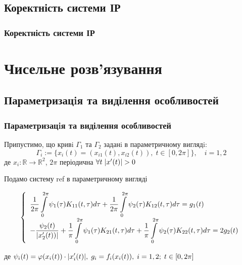 \documentclass{beamer}
\numberwithin{equation}{section}
\newcommand{\intl}{\int\limits}
\newcommand{\inttwopi}{\intl_{0}^{2\pi}}
\begin{document}
	\subsection{Коректність системи ІР}
	\begin{frame}
		\frametitle{Коректність системи ІР}
	\end{frame}
	
	\section{Чисельне розв'язування} 
	
	\subsection{Параметризацiя та виділення особливостей} 
	
	\begin{frame}
		\frametitle{Параметризацiя та виділення особливостей}
		Припустимо, що кривi $\Gamma_{1}$ та $\Gamma_{2}$ заданi в параметричному виглядi:
		\begin{equation}
			\Gamma_{i} := \{ x_{i}(t) = (x_{i1}(t), x_{i2}(t)), \; t \in [ 0, 2\pi ] \} , \quad i = 1, 2
		\end{equation}
		\indent де $x_{i} : \mathbb{R} \rightarrow \mathbb{R}^2$, $2\pi$ періодична $\forall{t} \; \abs{x'(t)} > 0$ 
		
		Подамо систему ref в параметричному вигляді
		\begin{small}
			\begin{equation}
				\label{IE-parametrized-system}
				\left\{
				\begin{array}{l}
					\displaystyle
					\frac{1}{2\pi} \inttwopi \psi_1(\tau) K_{11}(t, \tau) d \tau
					+ \frac{1}{2\pi} \inttwopi  \psi_2(\tau) K_{12}(t, \tau) d \tau
					= g_{1}(t)
					\\ [0.3cm]
					\displaystyle
					- \frac{\psi_2(t)}{\abs{x'_{2}(t))}}
					+ \frac{1}{\pi} \inttwopi \psi_1(\tau) K_{21}(t, \tau) d \tau
					+ \frac{1}{\pi} \inttwopi  \psi_2(\tau) K_{22}(t, \tau) d \tau
					= 2g_{2}(t)
				\end{array}\right.
			\end{equation}
		
		де $\displaystyle \psi_{i}(t) = \varphi(x_{i}(t)) \cdot \abs{x'_{i}(t)}, \; g_{i} = f_{i}(x_{i}(t)), \;  i  = 1, 2; \; t \in [0, 2\pi]$ \\[0.3cm]
		
		\end{small}
	\end{frame}
	
\end{document}
